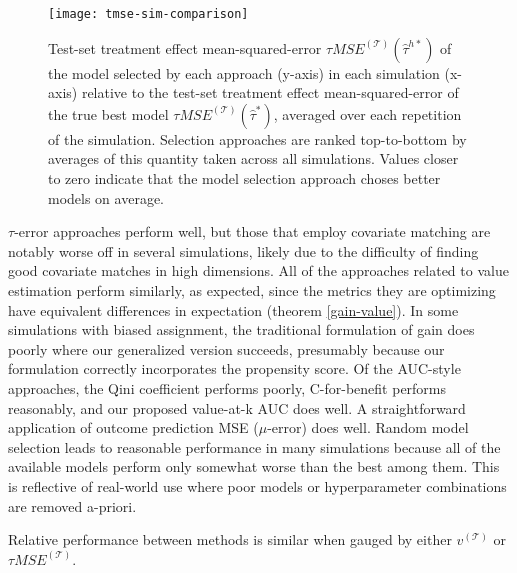 \begin{figure}
\centering
\texttt{[image: tmse-sim-comparison]}
\caption{Test-set treatment effect mean-squared-error $\tau MSE^{(\mathcal{T})}(\hat\tau^{h*})$ of the model selected by each approach (y-axis) in each simulation (x-axis) relative to the test-set  treatment effect mean-squared-error of the true best model $\tau MSE^{(\mathcal{T})}(\hat\tau^{*})$, averaged over each repetition of the simulation. Selection approaches are ranked top-to-bottom by averages of this quantity taken across all simulations. Values closer to zero indicate that the model selection approach choses better models on average.}
\end{figure}

$\tau$-error approaches perform well, but those that employ covariate matching are notably worse off in several simulations, likely due to the difficulty of finding good covariate matches in high dimensions. All of the approaches related to value estimation perform similarly, as expected, since the metrics they are optimizing have equivalent differences in expectation (theorem \ref{gain-value}). In some simulations with biased assignment, the traditional formulation of gain does poorly where our generalized version succeeds, presumably because our formulation correctly incorporates the propensity score. Of the AUC-style approaches, the Qini coefficient performs poorly, C-for-benefit performs reasonably, and our proposed value-at-k AUC does well. A straightforward application of outcome prediction MSE ($\mu$-error) does well. Random model selection leads to reasonable performance in many simulations because all of the available models perform only somewhat worse than the best among them. This is reflective of real-world use where poor models or hyperparameter combinations are removed a-priori. 

Relative performance between methods is similar when gauged by either $v^{(\mathcal T)}$ or $\tau MSE^{(\mathcal T)}$. 
